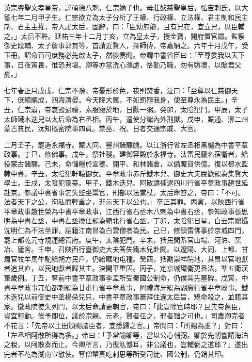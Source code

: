 
\begin{pinyinscope}

 英宗睿聖文孝皇帝，諱碩德八剌，仁宗嫡子也。母莊懿慈聖皇后，弘吉剌氏，以大德七年二月甲子生。仁宗欲立為太子分析了王權、行政權、立法權、君主制和民主制、君主主權，帝入謁太后，固辭，曰：「臣幼無能，且有兄在，宜立兄，以臣輔之。」太后不許。延祐三年十二月丁亥，立為皇太子，授金寶，開府置官屬。監察御史段輔、太子詹事郭貫等，首請近賢人，擇師傅，帝嘉納之。六年十月戊午，受玉冊，詔命百司庶務必先啟太子，然後奏聞。帝謂中書省臣曰：「至尊委我以天下事，日夜寅畏，惟恐弗堪。卿等亦當洗心滌慮，恪勤乃職，勿有隳壞，以貽君父憂。」



 七年春正月戊戌，仁宗不豫，帝憂形於色，夜則焚香，泣曰：「至尊以仁慈御天下，庶績順成，四海清晏。今天降大厲，不如罰殛我身，使至尊永為民主。」辛丑，仁宗崩，帝哀毀過禮，素服寢於地，日歠一粥。癸卯，太陰犯鬥。甲辰，太子太師鐵木迭兒以太后命為右丞相。丙午，遣使分讞內外刑獄。戊申，賑通、漷二州蒙古貧民，汰知樞密院事四員。禁巫、祝、日者交通宗戚、大官。



 二月壬子，罷造永福寺。賑大同、豐州諸驛饑。以江浙行省左丞相黑驢為中書平章政事。丁巳，修佛事。戊午，祭社稷。建御容殿於永福寺。汰富民竄名宿衛者，給役蒙古諸驛。己未，命儲糧於宣德、開平、和林諸倉，以備賑貸供億。復以都水監隸中書。辛丑，太陰犯軒轅御女。平章政事赤斤鐵木兒、御史大夫脫歡罷為集賢大學士。壬戌，太陰犯靈臺。甲子，鐵木迭兒、阿散請捕逮四川行省平章政事趙世延赴京。參議中書省事乞失監坐鬻官，刑部以法當杖，太后命笞之，帝曰：「不可。法者天下之公，徇私而輕重之，非示天下以公也。」卒正其罪。丙寅，以陜西行省平章政事趙世榮為中書平章政事，江西行省右丞木八剌為中書右丞，參知政事張思明為中書左丞，中書左丞換住罷為嶺北行省右丞。丁卯，太陰犯日星。白云宗總攝沈明仁為不法坐罪，詔籍江南冒為白雲僧者為民。己巳，修鎮雷佛事於京城四門，罷上都乾元寺規運總管府。庚午，太陰犯鬥。辛未，括民間系官山場、河泊、窯冶、廬舍。壬申，召陜西行臺御史大夫答失鐵木兒赴闕。以遼陽、大同、上都、甘肅官牧羊馬牛駝給朔方民戶，仍給曠地屯種。癸酉，括勘崇祥院地，其冒以官地獻者追其直，以民地獻者歸其主。決開平重囚。丙子，定京城環衛更番法，準五衛漢軍歲例。丁丑，奪前中書平章政事李孟所受秦國公制命，仍僕其先墓碑。戊寅，中書平章政事兀伯都剌罷為甘肅行省平章政事，阿禮海牙罷為湖廣行省平章政事。鐵木迭兒以前御史中丞楊朵兒只、中書平章政事蕭拜住違太后旨，矯命殺之，並籍其家。徽政院使失列門，以太后命請更朝官，帝曰：「此豈除官時耶？且先帝舊臣，豈宜輕動。俟予即位，議於宗親、元老，賢者任之，邪者黜之可也。」司農卿完者不花言：「先帝以土田頒賜諸臣者，宜悉歸之官。」帝問曰：「所賜為誰？」對曰：「左丞相阿散所得為多。」帝曰：「予常諭卿等，當以公心輔弼。卿於先朝嘗請海泊之稅，以阿散奏而止。今卿所言，乃復私憾耳，非公議也，豈輔弼之道耶？」遂出完者不花為湖南宣慰使。奪僧輦真吃剌思等所受司徒、國公制，仍銷其印。




\end{pinyinscope}
